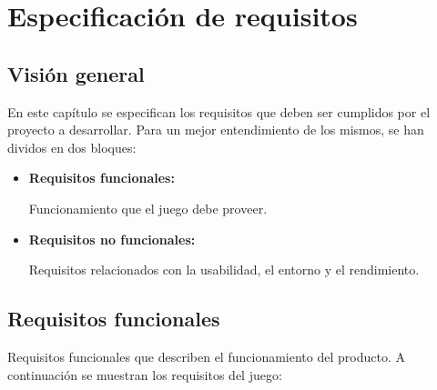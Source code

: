 \chapter{Especificación de requisitos}

\section{Visión general}

	En este capítulo se especifican los requisitos que deben ser cumplidos por el proyecto a desarrollar. Para un mejor entendimiento de los mismos, se han dividos en dos bloques:

	\begin{itemize}
			\item \textbf{Requisitos funcionales:}
				
			Funcionamiento que el juego debe proveer.
			
			\item \textbf{Requisitos no funcionales:}
				
			Requisitos relacionados con la usabilidad, el entorno y el rendimiento.
	\end{itemize}

\section{Requisitos funcionales}

	Requisitos funcionales que describen el funcionamiento del producto. A continuación se muestran los requisitos del juego:


